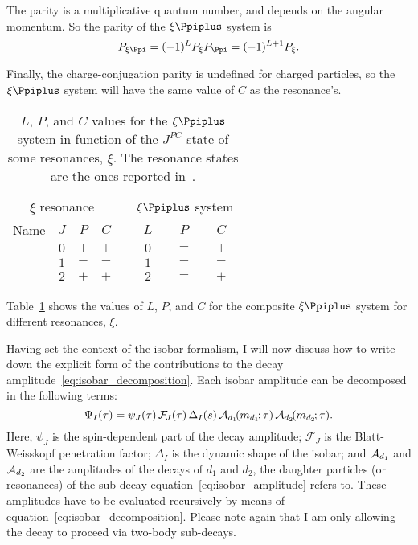     The parity is a multiplicative quantum number, and depends on the angular momentum.
    So the parity of the $\xi\Ppiplus$ system is
    \begin{equation}
        P_{\xi\Ppi} = (-1)^L P_{\xi} P_{\Ppi} = (-1)^{L+1} P_{\xi}.
    \end{equation}


    Finally, the charge-conjugation parity is undefined for charged particles, so the $\xi\Ppiplus$ system will have the same value of $C$ as the resonance's. 
    \begin{table}
        \centering
        \caption{$L$, $P$, and $C$ values for the $\xi\Ppiplus$ system in function of the $J^{PC}$ state of some resonances, $\xi$.
                 The resonance states are the ones reported in~\cite{chinese_phisics}.}
        \label{table:composite_resonance_system}
        \begin{tabular}{lccccccc}
            \toprule
            \multicolumn{4}{c}{$\xi$ resonance}   & &\multicolumn{3}{c}{$\xi\Ppiplus$ system} \\ \cline{1-4} \cline{6-8}
            Name   &$J$ &$P$ &$C$                 & &$L$ &$P$ &$C$\\
            \midrule
            \Pfnez{}    &$0$ &$+$ &$+$            & &$0$ &$-$ &$+$\\
            \Prhozero{} &$1$ &$-$ &$-$            & &$1$ &$-$ &$-$\\
            \Pfii{}     &$2$ &$+$ &$+$            & &$2$ &$-$ &$+$\\
            \bottomrule
        \end{tabular}
    \end{table}
    Table~\ref{table:composite_resonance_system} shows the values of $L$, $P$, and $C$ for the composite $\xi\Ppiplus$ system for different resonances, $\xi$.


    Having set the context of the isobar formalism, I will now discuss how to write down the explicit form of the contributions to the decay amplitude~\eqref{eq:isobar_decomposition}.
    Each isobar amplitude can be decomposed in the following terms:
    \begin{equation}\label{eq:isobar_amplitude}
        \Psi_I(\tau) = \psi_J(\tau)\,\mathcal{F\!}_{J}(\tau)\,\Delta_I(s)\,\mathcal{A}_{d_1}\!(m_{d_1\!}; \tau)\,\mathcal{A}_{d_2}\!(m_{d_2\!}; \tau).
    \end{equation}
    Here, $\psi_J$ is the spin-dependent part of the decay amplitude;
    $\mathcal{F\!}_J$ is the Blatt-Weisskopf penetration factor;
    $\Delta_I$ is the dynamic shape of the isobar;
    and $\mathcal{A}_{d_1}$ and $\mathcal{A}_{d_2}$ are the amplitudes of the decays of $d_1$ and $d_2$, the daughter particles (or resonances) of the sub-decay equation~\eqref{eq:isobar_amplitude} refers to.
    These amplitudes have to be evaluated recursively by means of equation~\eqref{eq:isobar_decomposition}.
    Please note again that I am only allowing the decay to proceed via two-body sub-decays.


